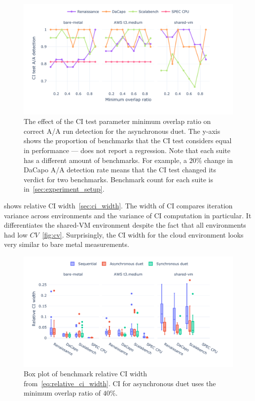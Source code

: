 \begin{figure}
	\centering
	\includegraphics[width=1\linewidth]{./figures/citest_aa_match_by_overlap.pdf}
	\caption{
		The effect of the CI test parameter minimum overlap ratio on correct A/A run detection for the asynchronous duet.
		The \mbox{y-axis} shows the proportion of benchmarks that the CI test considers equal in performance --- does not report a regression.
		Note that each suite has a different amount of benchmarks.
		For example, a $20\%$ change in DaCapo A/A detection rate means that the CI test changed its verdict for two benchmarks.
		Benchmark count for each suite is in~\cref{sec:experiment_setup}.
	}
	\label{fig:citest_overlap_aa}
\end{figure}

 shows relative CI width~\ref{sec:ci_width}.
The width of CI compares iteration variance across environments and the variance of CI computation in particular.
It differentiates the \mbox{shared-VM} environment despite the fact that all environments had low $CV$~\ref{fig:cv}.
Surprisingly, the CI width for the cloud environment looks very similar to bare metal measurements.

\begin{figure}
	\centering
	\includegraphics[width=1\linewidth]{./figures/ci_width.pdf}
	\caption{
		Box plot of benchmark relative CI width from~\cref{eq:relative_ci_width}.
		CI for asynchronous duet uses the minimum overlap ratio of $40\%$.
	}
	\label{fig:ci_width}
\end{figure}


